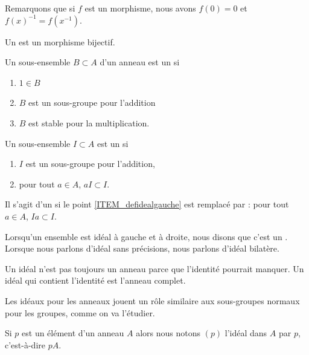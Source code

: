 Remarquons que si \( f\) est un morphisme, nous avons \( f(0)=0\) et \( f(x)^{-1}=f(x^{-1})\).

\begin{definition}
    Un  est un morphisme bijectif.
\end{definition}

\begin{definition}  \label{DefAJVTPxb}
    Un sous-ensemble \( B\subset A\) d'un anneau est un  si
    \begin{enumerate}
        \item
            \( 1\in B\)
        \item
            \( B\) est un sous-groupe pour l'addition
        \item
            \( B\) est stable pour la multiplication.
    \end{enumerate}
\end{definition}

\begin{definition}  \label{DefooQULAooREUIU}
    Un sous-ensemble \( I\subset A\) est un  si
    \begin{enumerate}
        \item
            \( I\) est un sous-groupe pour l'addition,
        \item  \label{ITEM_defidealgauche}
            pour tout \( a\in A\), \( aI\subset I\).
    \end{enumerate}
    Il s'agit d'un  si le point \ref{ITEM_defidealgauche} est remplacé par : pour tout \( a\in A\), \( Ia\subset I\).

    Lorsqu'un ensemble est idéal à gauche et à droite, nous disons que c'est un . Lorsque nous parlons d'idéal sans précisions, nous parlons d'idéal bilatère.
\end{definition}

\begin{remark}
    Un idéal n'est pas toujours un anneau parce que l'identité pourrait manquer. Un idéal qui contient l'identité est l'anneau complet.
    
    Les idéaux pour les anneaux jouent un rôle similaire aux sous-groupes normaux pour les groupes, comme on va l'étudier.
\end{remark}

\begin{definition}  \label{DefSKTooOTauAR}
    Si \( p\) est un élément d'un anneau \( A\) alors nous notons \( (p)\) l'idéal dans \( A\)  par \( p\), c'est-à-dire \( pA\).
\end{definition}

